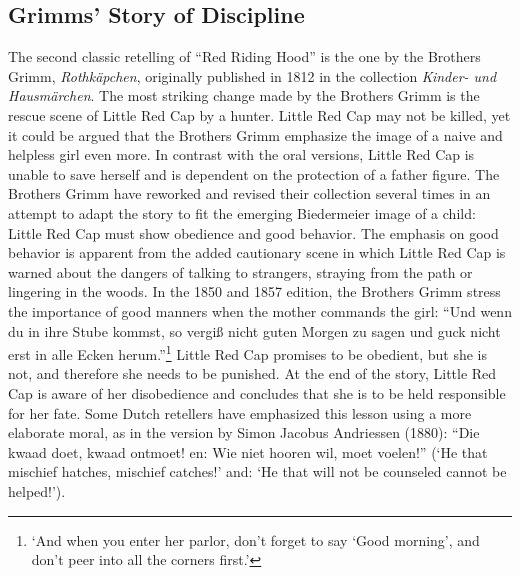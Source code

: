 \subsection{Grimms' Story of Discipline}
The second classic retelling of ``Red Riding Hood'' is the one by the Brothers Grimm, \emph{Rothkäpchen}, originally published in 1812 in the collection \emph{Kinder- und Hausmärchen}. The most striking change made by the Brothers Grimm is the rescue scene of Little Red Cap by a hunter. Little Red Cap may not be killed, yet it could be argued that the Brothers Grimm emphasize the image of a naive and helpless girl even more\autocite[32]{zipes:1993}. In contrast with the oral versions, Little Red Cap is unable to save herself and is dependent on the protection of a father figure. The Brothers Grimm have reworked and revised their collection several times in an attempt to adapt the story to fit the emerging Biedermeier image of a child: Little Red Cap must show obedience and good behavior\autocite[32--37. For an automatically generated alignment of the seven versions published by the Brothers Grimm, see \texttt{http://fbkarsdorp.github.io/grimms}.]{zipes:1993}. The emphasis on good behavior is apparent from the added cautionary scene in which Little Red Cap is warned about the dangers of talking to strangers, straying from the path or lingering in the woods. In the 1850 and 1857 edition, the Brothers Grimm stress the importance of good manners when the mother commands the girl: ``Und wenn du in ihre Stube kommst, so vergiß nicht guten Morgen zu sagen und guck nicht erst in alle Ecken herum.''\footnote{`And when you enter her parlor, don't forget to say `Good morning', and don't peer into all the corners first.'} Little Red Cap promises to be obedient, but she is not, and therefore she needs to be punished. At the end of the story, Little Red Cap is aware of her disobedience and concludes that she is to be held responsible for her fate. Some Dutch retellers have emphasized this lesson using a more elaborate moral, as in the version by Simon Jacobus Andriessen (1880): ``Die kwaad doet, kwaad ontmoet! en: Wie niet hooren wil, moet voelen!'' (`He that mischief hatches, mischief catches!' and: `He that will not be counseled cannot be helped!'). 

